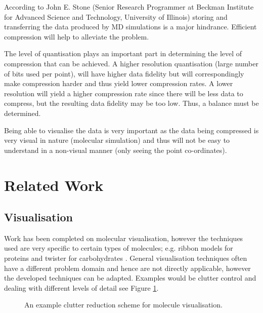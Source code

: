 \documentclass[a4paper,twocolumn]{article}
\begin{document}
According to John E. Stone (Senior Research Programmer at Beckman Institute
for Advanced Science and Technology, University of Illinois) storing and
transferring the data produced by MD simulations is a major
hindrance. Efficient compression will help to alleviate the problem.

The level of quantisation plays an important part in determining the level of
compression that can be achieved. A higher resolution quantisation (large
number of bits used per point), will have higher data fidelity but will
correspondingly make compression harder and thus yield lower compression
rates. A lower resolution will yield a higher compression rate since there
will be less data to compress, but the resulting data fidelity may be too
low. Thus, a balance must be determined.

Being able to visualise the data is very important as the data being compressed
is very visual in nature (molecular simulation) and thus will not be easy to
understand in a non-visual manner (only seeing the point co-ordinates).



\section{Related Work}

\subsection{Visualisation}

Work has been completed on molecular visualisation, however the techniques
used are very specific to certain types of molecules; e.g. ribbon models for
proteins \citep{carson87} and twister for carbohydrates
\citep{kuttel06}. General visualisation techniques often have a different
problem domain and hence are not directly applicable, however the developed
techniques can be adapted. Examples would be clutter control \citep{ellis07}
and dealing with different levels of detail see Figure \ref{fig:clutter}.

\begin{figure}
\centering
{}
\caption{An example clutter reduction scheme for molecule visualisation.}
\label{fig:clutter}
\end{figure}
\end{document}
